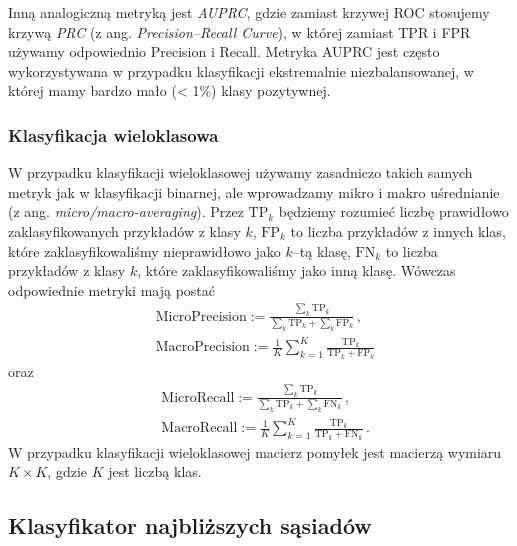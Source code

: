 \documentclass{myclass}
\numberwithin{equation}{subsection}
\begin{document}
Inną analogiczną metryką jest \emph{AUPRC}, gdzie zamiast krzywej ROC stosujemy krzywą \emph{PRC} (z
ang. \textit{Precision--Recall Curve}), w której zamiast TPR i FPR używamy odpowiednio Precision i
Recall. Metryka AUPRC jest często wykorzystywana w przypadku klasyfikacji ekstremalnie
niezbalansowanej, w której mamy bardzo mało (< 1\%) klasy pozytywnej.


\subsubsection{Klasyfikacja wieloklasowa}

W przypadku klasyfikacji wieloklasowej używamy zasadniczo takich samych metryk jak w klasyfikacji
binarnej, ale wprowadzamy mikro i makro uśrednianie (z ang. \textit{micro/macro-averaging}). Przez
\(\mathrm{TP}_k\) będziemy rozumieć liczbę prawidłowo zaklasyfikowanych przykładów z klasy \(k\),
\(\mathrm{FP}_k\) to liczba przykładów z innych klas, które zaklasyfikowaliśmy nieprawidłowo jako
\(k\)--tą klasę, \(\mathrm{FN}_k\) to liczba przykładów z klasy \(k\), które zaklasyfikowaliśmy jako
inną klasę. Wówczas odpowiednie metryki mają postać
\begin{equation}
    \begin{split}
        &\mathrm{MicroPrecision} := \frac{\sum_{k} \mathrm{TP}_k}{\sum_{k} \mathrm{TP}_k + \sum_{k} \mathrm{FP}_k}\,,\\
        &\mathrm{MacroPrecision} := \frac{1}{K} \sum_{k=1}^K \frac{\mathrm{TP}_k}{\mathrm{TP}_k + \mathrm{FP}_k}
    \end{split}
\end{equation}
oraz
\begin{equation}
    \begin{split}
        &\mathrm{MicroRecall} := \frac{\sum_{k} \mathrm{TP}_k}{\sum_{k} \mathrm{TP}_k + \sum_{k} \mathrm{FN}_k}\,,\\
        &\mathrm{MacroRecall} := \frac{1}{K} \sum_{k=1}^K \frac{\mathrm{TP}_k}{\mathrm{TP}_k + \mathrm{FN}_k}\,.
    \end{split}
\end{equation}
W przypadku klasyfikacji wieloklasowej macierz pomyłek jest macierzą wymiaru \(K \times K\), gdzie
\(K\) jest liczbą klas.


\subsection{Klasyfikator najbliższych sąsiadów}
\end{document}
